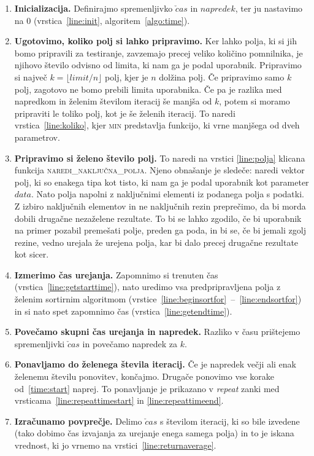 \documentclass[a4paper,oneside,12pt]{article}
\begin{document}
\begin{enumerate}
  \item \textbf{Inicializacija.} Definirajmo spremenljivko $\check{c}as$ in $napredek$, ter ju nastavimo na 0
    (vrstica~\ref{line:init}, algoritem~\ref{algo:time}).
  \item \textbf{Ugotovimo, koliko polj si lahko pripravimo.} \label{time:start} Ker lahko 
    polja, ki si jih bomo pripravili za testiranje, zavzemajo precej veliko količino
    pomnilnika, je njihovo število odvisno od
    limita, ki nam ga je podal uporabnik. Pripravimo si največ $k = \lfloor limit/n \rfloor$
    polj, kjer je $n$ dolžina polj.
    Če pripravimo samo $k$ polj, zagotovo ne bomo prebili limita uporabnika.
    Če pa je razlika med napredkom in želenim številom iteracij še manjša
    od $k$, potem si  moramo pripraviti le toliko polj, kot je še želenih iteracij.
    To naredi vrstica~\ref{line:koliko}, kjer \textsc{min} predstavlja funkcijo, ki vrne
    manjšega od dveh parametrov.
  \item \textbf{Pripravimo si želeno število polj.} To naredi na vrstici
   \ref{line:polja} klicana funkcija \textsc{naredi\_naključna\_polja}. Njeno obnašanje
    je sledeče: naredi vektor polj, ki so enakega tipa kot tisto, ki nam ga je podal 
    uporabnik kot parameter $data$. Nato polja napolni z
    naključnimi elementi iz podanega polja s podatki. Z izbiro naključnih elementov in ne 
    naključnih rezin preprečimo, da bi morda dobili drugačne nezaželene rezultate. To bi
    se lahko zgodilo, če bi uporabnik na primer pozabil premešati polje, preden ga poda, in bi se, če bi jemali 
    zgolj rezine, vedno urejala že urejena polja, kar bi dalo precej drugačne rezultate 
    kot sicer.
  \item \textbf{Izmerimo čas urejanja.} Zapomnimo si trenuten čas (vrstica~\ref{line:getstarttime}), nato uredimo vsa 
    predpripravljena polja z želenim
    sortirnim algoritmom (vrstice~\ref{line:beginsortfor}~--~\ref{line:endsortfor}) in si
    nato spet zapomnimo čas (vrstica~\ref{line:getendtime}).
  \item \textbf{Povečamo skupni čas urejanja in napredek.} Razliko v času prištejemo spremenljivki $\check{c}as$ in povečamo napredek za $k$. 
  \item \textbf{Ponavljamo do želenega števila iteracij.} Če je napredek večji ali enak želenemu številu ponovitev, končajmo. 
    Drugače ponovimo vse korake od~\ref{time:start} naprej. To ponavljanje je prikazano v
    \emph{repeat} zanki med vrsticama~\ref{line:repeattimestart} in
   \ref{line:repeattimeend}.
  \item \textbf{Izračunamo povprečje.} Delimo $\check{c}as$ s številom iteracij, ki so bile izvedene (tako dobimo čas
    izvajanja za urejanje enega samega polja) in to je iskana vrednost, ki jo vrnemo na
    vrstici~\ref{line:returnaverage}.
\end{enumerate}
\end{document}
